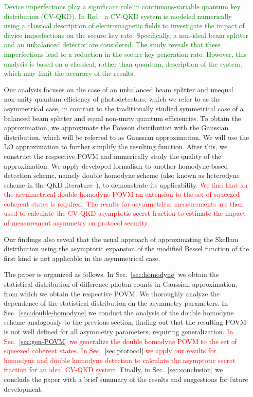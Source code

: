 \documentclass[%
reprint,
superscriptaddress,
 amsmath,amssymb,amsfonts,
 aps,
 pra,
 longbibliography
]{revtex4-2}
\begin{document}
\textcolor{green}{Device imperfections play a significant role in continuous-variable quantum key distribution (CV-QKD). In Ref.~\cite{ruiz2023effects} a CV-QKD system is modeled numerically using a classical description of electromagnetic fields to investigate the impact of device imperfections on the secure key rate. Specifically, a non-ideal beam splitter and an unbalanced detector are considered. The study reveals that these imperfections lead to a reduction in the secure key generation rate. However, this analysis is based on a classical, rather than quantum, description of the system, which may limit the accuracy of the results.}

Our analysis focuses on the case of an unbalanced beam splitter and unequal non-unity quantum
efficiency of photodetectors, which we refer to as the asymmetrical case, in contrast to the
traditionally studied symmetrical case of a balanced beam splitter and equal non-unity quantum
efficiencies. To obtain the approximation, we approximate the Poisson distribution with the Gaussian
distribution, which will be referred to as Gaussian approximation. We will use the LO approximation
to further simplify the resulting function. After this, we construct the respective POVM and
numerically study the quality of the approximation. We apply developed formalism to another
homodyne-based detection scheme, namely double homodyne scheme (also known as heterodyne scheme in
the QKD literature~\cite{Pirandola:20,opt3040030,Zhang:apr:2024}), to demonstrate its applicability. \textcolor{red}{We find that for the asymmetrical double homodyne POVM an extension to the set of squeezed coherent states is required. The results for asymmetrical measurements are then used to calculate the CV-QKD asymptotic secret fraction to estimate the impact of measurement asymmetry on protocol security.}

Our findings also reveal that the usual approach of approximating the Skellam distribution using the
asymptotic expansion of the modified Bessel function of the first kind is not applicable in the
asymmetrical case.

The paper is organized as follows.  In Sec.~\ref{sec:homodyne} we obtain the statistical
distribution of difference photon counts in Gaussian approximation, from which we obtain the
respective POVM. We thoroughly analyze the dependence of the statistical distribution on the asymmetry
parameters.  In Sec.~\ref{sec:double-homodyne} we conduct the analysis of the double homodyne scheme
analogously to the previous section, finding out that the resulting POVM is not well defined for all asymmetry parameters, requiring generalization.
\textcolor{red}{
In Sec.~\ref{sec:gen-POVM} we generalize the double homodyne POVM to the set of squeezed coherent states. 
In Sec.~\ref{sec:protocol} we apply our results for homodyne and double homodyne detection to calculate the asymptotic secret fraction for an ideal CV-QKD system. }
Finally, in Sec.~\ref{sec:conclusion} we conclude the paper with a brief summary of the results and
suggestions for future development.
\end{document}
